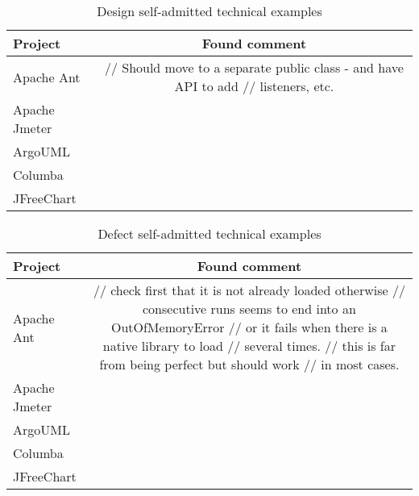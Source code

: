 \begin{table}[!hbt]
      \begin{center}
            \caption{Design self-admitted technical examples}
            \label{tab:design_debt_detail}
            \begin{tabular}{l| c }
            \toprule
            \textbf{Project}      & \textbf{Found comment}     \\ \midrule 
              Apache Ant          &   // Should move to a separate public class - and have API to add // listeners, etc.\\                                   
              Apache Jmeter       &   \\                                   
              ArgoUML             &   \\                                   
              Columba             &   \\                                   
              JFreeChart          &   \\ \bottomrule
            \end{tabular}
      \end{center}
\end{table}

\begin{table}[!hbt]
      \begin{center}
            \caption{Defect self-admitted technical examples}
            \label{tab:defect_debt_detail}
            \begin{tabular}{l| c }
            \toprule
            \textbf{Project}      & \textbf{Found comment}     \\ \midrule 
              Apache Ant          & // check first that it is not already loaded otherwise // consecutive runs seems to end into an OutOfMemoryError // or it fails when there is a native library to load // several times. // this is far from being perfect but should work // in most cases. \\                                   
              Apache Jmeter       &   \\                                   
              ArgoUML             &   \\                                   
              Columba             &   \\                                   
              JFreeChart          &   \\ \bottomrule
            \end{tabular}
      \end{center}
\end{table}

